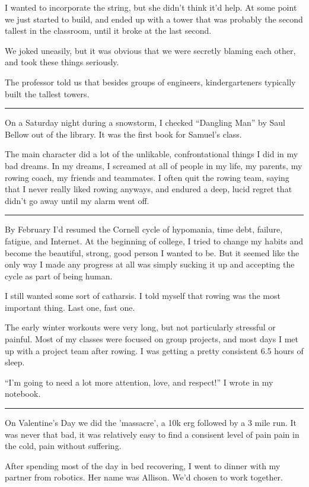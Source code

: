 I wanted to incorporate the string, but she didn't think it'd help.  At some
point we just started to build, and ended up with a tower that was probably the
second tallest in the classroom, until it broke at the last second.

We joked uneasily, but it was obvious that we were secretly blaming each other,
and took these things seriously.

The professor told us that besides groups of engineers, kindergarteners
typically built the tallest towers. 

\plainfancybreak{12pt}{2}{* * *}

On a Saturday night during a snowstorm, I checked ``Dangling Man'' by Saul
Bellow out of the library.  It was the first book for Samuel's class.

The main character did a lot of the unlikable, confrontational things I did in
my bad dreams.  In my dreams,  I screamed at all of people in my life, my
parents, my rowing coach, my friends and teammates.  I often quit the rowing
team, saying that I never really liked rowing anyways, and endured a deep, lucid
regret that didn't go away until my alarm went off.

\plainfancybreak{12pt}{2}{* * *}

By February I'd resumed the Cornell cycle of hypomania, time debt, failure,
fatigue, and Internet.  At the beginning of college, I tried to change my habits
and become the beautiful, strong, good person I wanted to be.  But it seemed
like the only way I made any progress at all was simply sucking it up and
accepting the cycle as part of being human.

I still wanted some sort of catharsis.  I told myself that rowing was the most
important thing.  Last one, fast one.

The early winter workouts were very long, but not particularly stressful or
painful.  Most of my classes were focused on group projects, and most days I met
up with a project team after rowing.  I was getting a pretty consistent 6.5
hours of sleep.

``I'm going to need a lot more attention, love, and respect!'' I wrote in my
notebook. 

\plainfancybreak{12pt}{2}{* * *}

On Valentine's Day we did the 'massacre', a 10k erg followed by a 3 mile run.
It was never that bad, it was relatively easy to find a consisent level of pain
pain in the cold, pain without suffering. 

After spending most of the day in bed recovering, I went to dinner with my
partner from robotics.  Her name was Allison.  We'd chosen to work together.  

